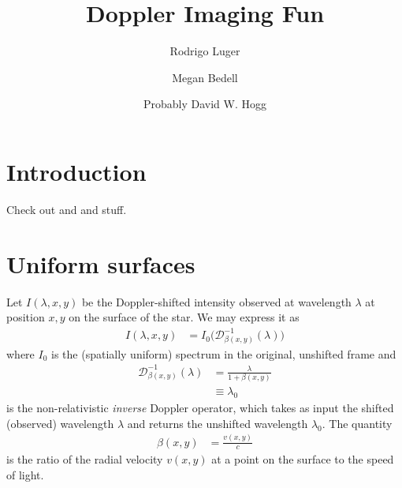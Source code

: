 \documentclass[modern]{aastex62}
\begin{document}
\title{Doppler Imaging Fun}

\author[0000-0002-0296-3826]{Rodrigo Luger}
%
\author{Megan Bedell}
%
\author{Probably David W. Hogg}

%
\section{Introduction}
Check out \citet{Luger2019} and \citet{Bedell2019} and stuff.

%
\section{Uniform surfaces}
\label{sec:uniform surfaces}

Let $I(\lambda, x, y)$ be the Doppler-shifted intensity observed at wavelength $\lambda$ at
position $x, y$ on the surface of the star. We may express it as
%
\begin{align}
    \label{eq:IntensityUnif}
    I(\lambda, x, y) &= I_0\Big(\mathcal{D}^{-1}_{\beta(x, y)}(\lambda)\Big)
\end{align}
%
where $I_0$ is the (spatially uniform) spectrum in the original, unshifted frame
and 
%
\begin{align}
    \mathcal{D}^{-1}_{\beta(x, y)}(\lambda) &= \frac{\lambda}{1 + \beta(x, y)} \nonumber \\
                                            &\equiv \lambda_0
\end{align}
%
is the non-relativistic \emph{inverse} Doppler operator, which takes as input the shifted (observed)
wavelength $\lambda$ and returns the unshifted wavelength $\lambda_0$.
The quantity
%
\begin{align}
    \beta(x, y) &= \frac{v(x, y)}{c}
\end{align}
%
is the ratio of the radial velocity $v(x, y)$ at a point on the
surface to the speed of light.
\end{document}
